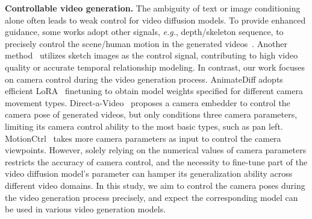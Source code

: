 \noindent \textbf{Controllable video generation.}
% 
The ambiguity of text or image conditioning alone often leads to weak control for video diffusion models.
% 
To provide enhanced guidance, some works adopt other signals, \emph{e.g.}, depth/skeleton sequence, to precisely control the scene/human motion in the generated videos~\citep{sparsectrl, chen2023control, zhang2023controlvideo, khachatryan2023text2video, hu2023animate, xu2023magicanimate}.
%
Another method~\citep{sparsectrl} utilizes sketch images as the control signal, contributing to high video quality or accurate temporal relationship modeling.
% 
In contrast, our work focuses on camera control during the video generation process. AnimateDiff adopts efficient LoRA~\citep{hu2021lora} finetuning to obtain model weights specified for different camera movement types.
% 
Direct-a-Video~\citep{directavideo} proposes a camera embedder to control the camera pose of generated videos, but only conditions three camera parameters, limiting its camera control ability to the most basic types, such as pan left.
%
MotionCtrl~\citep{motionctrl} takes more camera parameters as input to control the camera viewpoints.
%
However, solely relying on the numerical values of camera parameters restricts the accuracy of camera control, and the necessity to fine-tune part of the video diffusion model's parameter can hamper its generalization ability across different video domains.
%
In this study, we aim to control the camera poses during the video generation process precisely, and expect the corresponding model can be used in various video generation models.

